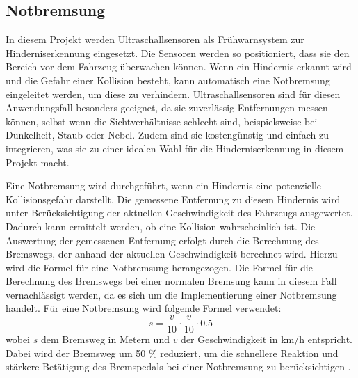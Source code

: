     \subsection{Notbremsung} %
    In diesem Projekt werden Ultraschallsensoren als Frühwarnsystem zur Hinderniserkennung eingesetzt. Die Sensoren werden so positioniert, dass sie den Bereich vor dem Fahrzeug überwachen können. Wenn ein Hindernis erkannt wird und die Gefahr einer Kollision besteht, kann automatisch eine Notbremsung eingeleitet werden, um diese zu verhindern. 
    Ultraschallsensoren sind für diesen Anwendungsfall besonders geeignet, da sie zuverlässig Entfernungen messen können, selbst wenn die Sichtverhältnisse schlecht sind, beispielsweise bei Dunkelheit, Staub oder Nebel. Zudem sind sie kostengünstig und einfach zu integrieren, was sie zu einer idealen Wahl für die Hinderniserkennung in diesem Projekt macht.

    Eine Notbremsung wird durchgeführt, wenn ein Hindernis eine potenzielle Kollisionsgefahr darstellt. Die gemessene Entfernung zu diesem Hindernis wird unter Berücksichtigung der aktuellen Geschwindigkeit des Fahrzeugs ausgewertet. Dadurch kann ermittelt werden, ob eine Kollision wahrscheinlich ist.
    Die Auswertung der gemessenen Entfernung erfolgt durch die Berechnung des Bremswegs, der anhand der aktuellen Geschwindigkeit berechnet wird. Hierzu wird die Formel für eine Notbremsung herangezogen. Die Formel für die Berechnung des Bremswegs bei einer normalen Bremsung kann in diesem Fall vernachlässigt werden, da es sich um die Implementierung einer Notbremsung handelt. Für eine Notbremsung wird folgende Formel verwendet: 
    \begin{equation}
        s = \frac{v}{10} \cdot \frac{v}{10} \cdot 0.5
    \end{equation} 
    wobei \( s \) dem Bremsweg in Metern und \( v \) der Geschwindigkeit in km/h entspricht. \\
    Dabei wird der Bremsweg um 50 \% reduziert, um die schnellere Reaktion und stärkere Betätigung des Bremspedals bei einer Notbremsung zu berücksichtigen \cite{BremswegBerechnen}. 
    
